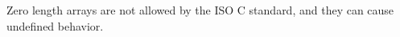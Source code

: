 \note Zero length arrays are not allowed by the ISO C standard,
and they can cause undefined behavior.




\section{}




\pagebreak



